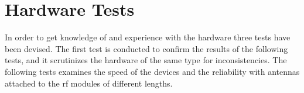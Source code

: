 \section{Hardware Tests} %
\label{sec:hardware_tests}
In order to get knowledge of and experience with the hardware three tests have been devised.
The first test is conducted to confirm the results of the following tests, and it scrutinizes the hardware of the same type for inconsistencies.
The following tests examines the speed of the devices and the reliability with antennas attached to the \gls{rf} modules of different lengths.

% 
% 
